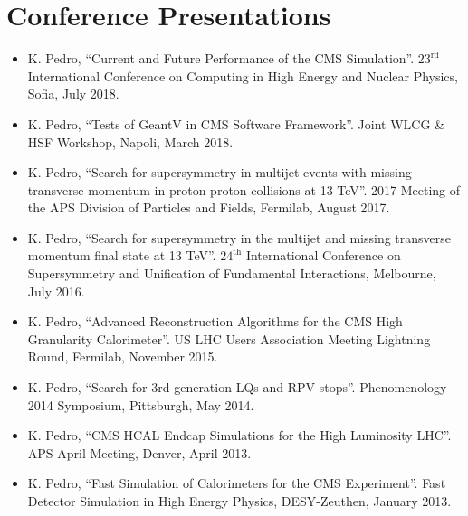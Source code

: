\section{Conference Presentations}
\begin{itemize}[leftmargin=12pt]
\item K. Pedro, ``Current and Future Performance of the CMS Simulation''. $23^{\text{rd}}$ International Conference on Computing in High Energy and Nuclear Physics, Sofia, July 2018.
\ifdefined\longflag
\item K. Pedro, ``Tests of GeantV in CMS Software Framework''. Joint WLCG \& HSF Workshop, Napoli, March 2018.
\fi
\item K. Pedro, ``Search for supersymmetry in multijet events with missing transverse momentum in proton-proton collisions at 13 TeV''. 2017 Meeting of the APS Division of Particles and Fields, Fermilab, August 2017.
\item K. Pedro, ``Search for supersymmetry in the multijet and missing transverse momentum final state at 13 TeV''. $24^{\text{th}}$ International Conference on Supersymmetry and Unification of Fundamental Interactions, Melbourne, July 2016.
\item K. Pedro, ``Advanced Reconstruction Algorithms for the CMS High Granularity Calorimeter''. US LHC Users Association Meeting Lightning Round, Fermilab, November 2015.
\item K. Pedro, ``Search for 3rd generation LQs and RPV stops''. Phenomenology 2014 Symposium, Pittsburgh, May 2014.
\item K. Pedro, ``CMS HCAL Endcap Simulations for the High Luminosity LHC''. APS April Meeting, Denver, April 2013.
\item K. Pedro, ``Fast Simulation of Calorimeters for the CMS Experiment''. Fast Detector Simulation in High Energy Physics, DESY-Zeuthen, January 2013.
\end{itemize}

\ifdefined\longflag
